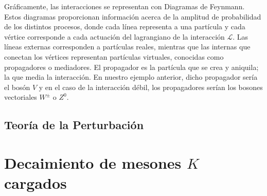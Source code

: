 Gráficamente, las interacciones se representan con Diagramas de Feynmann. Estos diagramas proporcionan información acerca de la amplitud de probabilidad de los distintos procesos, donde cada línea representa a una partícula y cada vértice corresponde a cada actuación del lagrangiano de la interacción $\mathcal{L}$. Las líneas externas corresponden a partículas reales, mientras que las internas que conectan los vértices representan partículas virtuales, conocidas como propagadores o mediadores. El propagador es la partícula que se crea y aniquila; la que media la interacción. En nuestro ejemplo anterior, dicho propagador sería el bosón $V$  y en el caso de la interacción débil, los propagadores serían los bosones vectoriales $W^{\pm}$ o $Z^0$.







\subsection{Teoría de la Perturbación}\label{sec:perturbation_theory}

\section{Decaimiento de mesones $K$ cargados}
\label{sec:charged_kaon_decay}
\vspace{5mm}